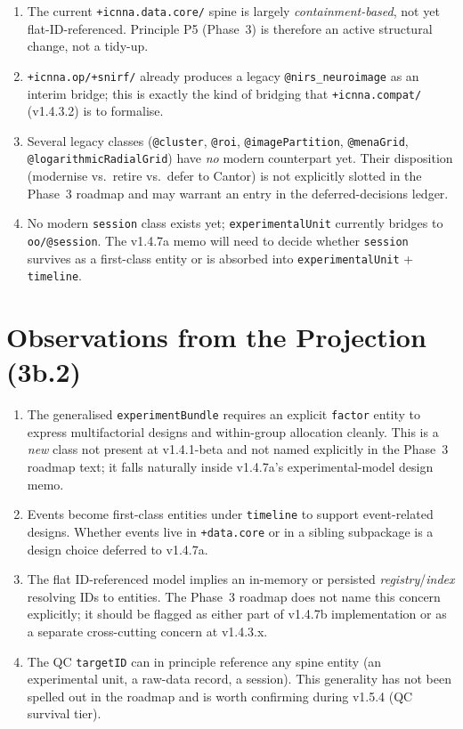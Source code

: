 \documentclass[11pt,a4paper]{article}
\begin{document}
\begin{enumerate}[nosep]
    \item The current \texttt{+icnna.data.core/} spine is largely \emph{containment-based}, not yet flat-ID-referenced. Principle P5 (Phase~3) is therefore an active structural change, not a tidy-up.
    \item \texttt{+icnna.op/+snirf/} already produces a legacy \texttt{@nirs\_neuroimage} as an interim bridge; this is exactly the kind of bridging that \texttt{+icnna.compat/} (v1.4.3.2) is to formalise.
    \item Several legacy classes (\texttt{@cluster}, \texttt{@roi}, \texttt{@imagePartition}, \texttt{@menaGrid}, \texttt{@logarithmicRadialGrid}) have \emph{no} modern counterpart yet. Their disposition (modernise vs.\ retire vs.\ defer to Cantor) is not explicitly slotted in the Phase~3 roadmap and may warrant an entry in the deferred-decisions ledger.
    \item No modern \texttt{session} class exists yet; \texttt{experimentalUnit} currently bridges to \texttt{oo/@session}. The v1.4.7a memo will need to decide whether \texttt{session} survives as a first-class entity or is absorbed into \texttt{experimentalUnit} + \texttt{timeline}.
\end{enumerate}

\section{Observations from the Projection (3b.2)}

\begin{enumerate}[nosep]
    \item The generalised \texttt{experimentBundle} requires an explicit \texttt{factor} entity to express multifactorial designs and within-group allocation cleanly. This is a \emph{new} class not present at v1.4.1-beta and not named explicitly in the Phase~3 roadmap text; it falls naturally inside v1.4.7a's experimental-model design memo.
    \item Events become first-class entities under \texttt{timeline} to support event-related designs. Whether events live in \texttt{+data.core} or in a sibling subpackage is a design choice deferred to v1.4.7a.
    \item The flat ID-referenced model implies an in-memory or persisted \emph{registry}/\emph{index} resolving IDs to entities. The Phase~3 roadmap does not name this concern explicitly; it should be flagged as either part of v1.4.7b implementation or as a separate cross-cutting concern at v1.4.3.x.
    \item The QC \texttt{targetID} can in principle reference any spine entity (an experimental unit, a raw-data record, a session). This generality has not been spelled out in the roadmap and is worth confirming during v1.5.4 (QC survival tier).
\end{enumerate}
\end{document}

